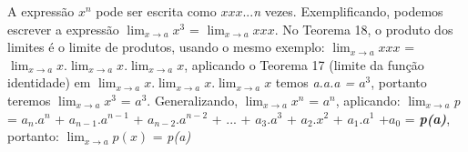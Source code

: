A expressão $x^{n}$ pode ser escrita como $x$$x$$x$...\textit{n} vezes. Exemplificando, podemos escrever a expressão $\lim_{x\rightarrow a}$$x^{3}$ = $\lim_{x\rightarrow a}$${xxx}$. No Teorema 18, o produto dos limites é o limite de produtos, usando o mesmo exemplo: $\lim_{x\rightarrow a}$${xxx}$ = $\lim_{x\rightarrow a}$${x}$.$\lim_{x\rightarrow a}$${x}$.$\lim_{x\rightarrow a}$${x}$,  aplicando o Teorema 17 (limite da função identidade) em  $\lim_{x\rightarrow a}$${x}$.$\lim_{x\rightarrow a}$${x}$.$\lim_{x\rightarrow a}$${x}$ temos \textit{a.a.a = $a^{3}$}, portanto teremos $\lim_{x\rightarrow a}$$x^{3}$ = $a^{3}$. Generalizando, $\lim_{x\rightarrow a}$$x^{n}$ = $a^{n}$, aplicando:
\newline
 $\lim_{x\rightarrow a}$\textit{p} = $a_{n}$.$a^{n}$ + $a_{n-1}$.$a^{n-1}$ + $a_{n-2}$.$a^{n-2}$ + ... + $a_{3}$.$a^{3}$ + $a_{2}$.$x^{2}$ + $a_{1}$.$a^{1}$ +$a_{0}$ = \textbf{\textit{p(a)}}, portanto:
$\lim_{x\rightarrow a}$$p(x)$ = \textit{p(a)}




